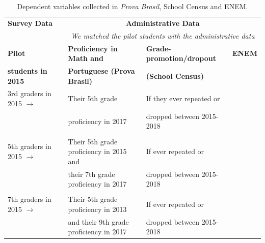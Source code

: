 \documentclass[
	article,			%
	12pt,				%
	oneside,			%
	a4paper,			%
	]{article}
\begin{document}
\begin{table}[h!]
\centering
\begin{threeparttable} 
\fontsize{9}{11}\selectfont
\caption{Dependent variables collected in \textit{Prova Brasil}, School Census and ENEM.}
\begin{tabular}{lllll}
\hline
{\bf Survey Data} &     {\bf } & \multicolumn{ 3}{c}{{\bf Administrative Data}} \\

    {\bf } &     {\bf } & \multicolumn{ 3}{c}{{\it We matched the pilot students with the administrative data}} \\

{\bf Pilot } &     {\bf } & {\bf Proficiency in Math and} & {\bf Grade-promotion/dropout} & {\bf ENEM} \\

{\bf  students in 2015} &            & {\bf Portuguese (Prova Brasil) } & {\bf (School Census)} &     {\bf } \\
\hline
\hline
\multicolumn{ 1}{l}{3rd graders in 2015 $\rightarrow$} & \multicolumn{ 1}{l}{{\bf }} & Their 5th grade  & If they ever repeated or  &            \\

\multicolumn{ 1}{l}{} & \multicolumn{ 1}{l}{} & proficiency in 2017  & dropped between 2015-2018 &            \\

           &            &            &            &            \\

\multicolumn{ 1}{l}{5th graders in 2015 $\rightarrow$} & \multicolumn{ 1}{l}{{\bf }} & Their 5th grade proficiency in 2015 and  & If ever repeated or  &            \\

\multicolumn{ 1}{l}{} & \multicolumn{ 1}{l}{} & their 7th grade proficiency in 2017 & dropped between 2015-2018 &            \\

           &            &            &            &            \\

\multicolumn{ 1}{l}{7th graders in 2015 $\rightarrow$} & \multicolumn{ 1}{l}{{\bf }} & Their 5th grade proficiency in 2013  & If ever repeated or  &            \\

\multicolumn{ 1}{l}{} & \multicolumn{ 1}{l}{} & and their 9th grade proficiency in 2017 & dropped between 2015-2018 &            \\


\end{tabular}
\end{threeparttable}
\end{table}
\end{document}
